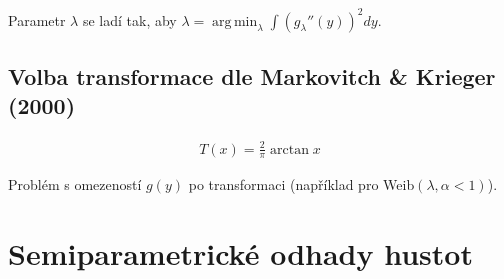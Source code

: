 \documentclass{article}
\theoremstyle{remark}
\theoremstyle{plain}
\theoremstyle{definition}
\theoremstyle{remark}
\DeclareMathOperator*{\argmin}{arg\,min}
\begin{document}
Parametr $\lambda$ se ladí tak, aby $\lambda=\argmin_{\lambda} \int \left(g_\lambda''(y)\right)^2dy$.

\subsection{Volba transformace dle Markovitch \& Krieger (2000)}

\begin{align*}
    T(x)=\frac{2}{\pi}\arctan x
\end{align*}

Problém s omezeností $g(y)$ po transformaci (například pro Weib$(\lambda,\alpha<1)$).

\section{Semiparametrické odhady hustot}
\end{document}
